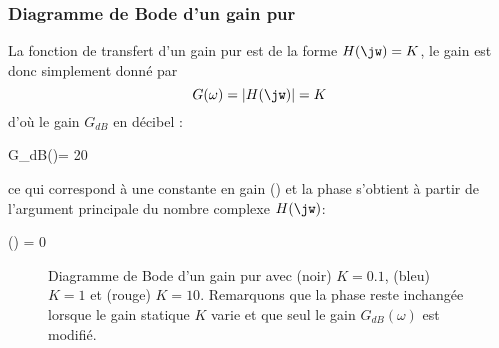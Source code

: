 \subsubsection{Diagramme de Bode d'un gain pur}
La fonction de transfert d'un gain pur est de la forme $H(\jw)=K$,
le gain est donc simplement donné par 
\[
G(\omega)=|H(\jw)|=K
\] 
d'où le gain $G_{dB}$ en décibel :
\begin{bequation}
G_{dB}(\omega)= 20
\end{bequation} ce qui correspond à une constante en gain 
() et la phase s'obtient à partir de l'argument 
principale du nombre complexe $H(\jw)$:
\begin{bequation}
\phi(\omega) = 0
\end{bequation}
\begin{figure}[!h]
    \centering
    

    
    \caption{Diagramme de Bode d'un gain pur avec (noir) 
             $K=0.1$, (bleu) $K=1$ et (rouge) $K=10$. Remarquons que la 
             phase reste inchangée lorsque le gain statique $K$ varie et que 
             seul le gain $G_{dB}(\omega)$ est modifié. \label{fig-bode_gain}}
\end{figure}
\newpage

